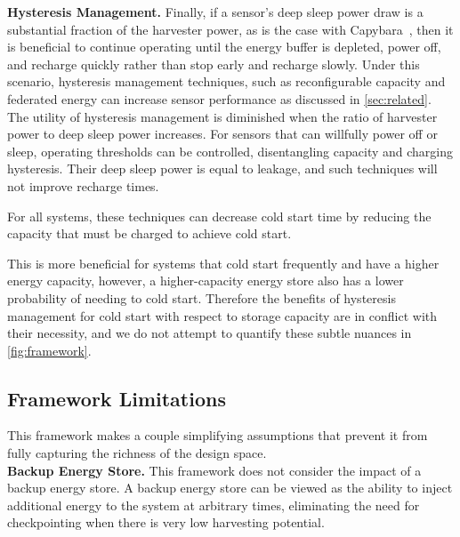 \vspace{-6pt}
\noindent
\textbf{Hysteresis Management.}
Finally, if a sensor's deep sleep power draw %
is a substantial fraction of the harvester power, as
is the case with Capybara~\cite{colinReconfigurable18}, then it is
beneficial to continue operating until the energy
buffer is depleted, power off, and recharge quickly
rather than stop early and recharge slowly.
Under this scenario, hysteresis management techniques,
such as reconfigurable capacity and federated energy can increase sensor
performance as discussed in \cref{sec:related}.
The utility of hysteresis management is diminished
when the ratio of harvester power to deep sleep power increases.
For sensors that can willfully power off or sleep,
operating thresholds can be controlled, disentangling
capacity and charging hysteresis.
Their deep
sleep power is equal to leakage, and such techniques
will not improve recharge times.

For all systems, these techniques can decrease cold start time
by reducing the capacity that must be charged
to achieve cold start.

This is more beneficial for systems that cold start frequently and
have a higher energy capacity, however,
a higher-capacity energy store also has a lower probability of
needing to cold start. Therefore the benefits of hysteresis management for
cold start with respect to storage capacity are in conflict with their necessity,
and we do not attempt to quantify these subtle nuances in \cref{fig:framework}.

\subsection{Framework Limitations}
\label{sec:framework:limitations}
This framework makes a couple simplifying assumptions that prevent it from
fully capturing the richness of the design space.\\

\vspace{-6pt}
\noindent
\textbf{Backup Energy Store.}
This framework does not consider the impact of a backup energy store.
A backup energy store can be viewed as the ability to inject additional energy
to the system at arbitrary times,
eliminating the need for checkpointing when there is very low
harvesting potential.

